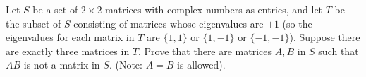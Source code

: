 Let $S$ be a set of $2 \times 2$ matrices with complex numbers as entries, and
let $T$ be the subset of $S$ consisting of matrices whose eigenvalues are $\pm
1$ (so the eigenvalues for each matrix in $T$ are $\lbrace 1, 1\rbrace$ or
$\lbrace 1, -1\rbrace$ or $\lbrace -1, -1\rbrace$). Suppose there are exactly
three matrices in $T$. Prove that there are matrices $A, B$ in $S$ such that
$AB$ is not a matrix in $S$. (Note: $A = B$ is allowed).
